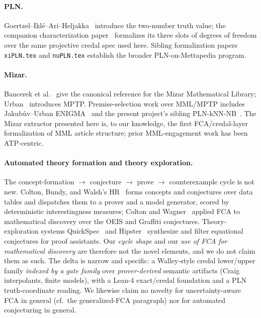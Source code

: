 \documentclass[]{article}
\newcommand{\lid}[1]{{\ttfamily\nolinkurl{#1}}}
\begin{document}
\paragraph{PLN.} Goertzel--Iklé--Ari--Heljakka~\cite{goertzel2008} introduce the
two-number truth value; the companion characterization
paper~\cite{pln-credal-degrees-of-freedom} formalizes its three slots of degrees
of freedom over the same projective credal spec used here. Sibling formalization
papers \lid{xiPLN.tex} and \lid{nuPLN.tex} establish the broader PLN-on-Mettapedia
program.

\paragraph{Mizar.} Bancerek et al.~\cite{bancerek2018} give the canonical reference
for the Mizar Mathematical Library; Urban~\cite{urban2003mptp} introduces MPTP.
Premise-selection work over MML/MPTP includes Jakub\r{u}v--Urban
ENIGMA~\cite{jakubuv2019enigma} and the present project's sibling
PLN-kNN-NB~\cite{pln-knn-nb}. The Mizar extractor presented here is, to our
knowledge, the first FCA/credal-layer formalization of MML article structure;
prior MML-engagement work has been ATP-centric.

\paragraph{Automated theory formation and theory exploration.} The
concept-formation $\to$ conjecture $\to$ prove $\to$ counterexample cycle is not
new. Colton, Bundy, and Walsh's HR~\cite{colton1999hr} forms concepts and
conjectures over data tables and dispatches them to a prover and a model generator,
scored by deterministic interestingness measures; Colton and
Wagner~\cite{colton2007fca} applied FCA to mathematical discovery over the OEIS and
Graffiti conjectures. Theory-exploration systems QuickSpec~\cite{quickspec} and
Hipster~\cite{hipster} synthesize and filter equational conjectures for proof
assistants. Our \emph{cycle shape} and our \emph{use of FCA for mathematical
discovery} are therefore not the novel elements, and we do not claim them as such.
The delta is narrow and specific: a Walley-style credal lower/upper family
\emph{indexed by a gate family} over \emph{prover-derived} semantic artifacts
(Craig interpolants, finite models), with a Lean-4 exact/credal foundation and a PLN
truth-coordinate reading. We likewise claim no novelty for uncertainty-aware FCA in
general (cf.\ the generalized-FCA paragraph) nor for automated conjecturing in
general.
\end{document}
